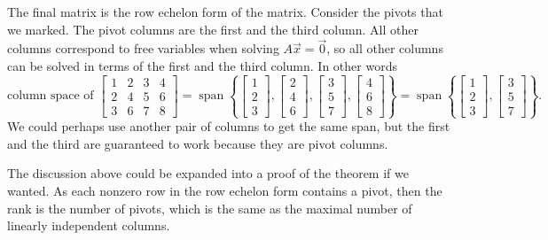 The final matrix is the row echelon form of the matrix.
Consider the pivots that we marked.
The pivot columns are the first and the third
column.  All other columns correspond to free variables when solving
$A \vec{x} = \vec{0}$, so all other columns can be solved in terms of the first and
the third column.  In other words
\begin{equation*}
\text{column space of }
\begin{bmatrix}
1 & 2 & 3 & 4 \\
2 & 4 & 5 & 6 \\
3 & 6 & 7 & 8
\end{bmatrix}
=
\operatorname{span}
\left\{
\begin{bmatrix}
1 \\
2 \\
3
\end{bmatrix}
,
\begin{bmatrix}
2 \\
4 \\
6
\end{bmatrix}
,
\begin{bmatrix}
3 \\
5 \\
7
\end{bmatrix}
,
\begin{bmatrix}
4 \\
6 \\
8
\end{bmatrix}
\right\}
=
\operatorname{span}
\left\{
\begin{bmatrix}
1 \\
2 \\
3
\end{bmatrix}
,
\begin{bmatrix}
3 \\
5 \\
7
\end{bmatrix}
\right\} .
\end{equation*}
We could perhaps use another pair of columns to get the same span, but the
first and the third are guaranteed to work because they are pivot columns.

The discussion above could be expanded into a proof of the theorem if
we wanted.
As each nonzero row
in the row echelon form contains a pivot, then the rank is the number of
pivots, which is the same as the maximal number of linearly independent
columns.

\medskip

